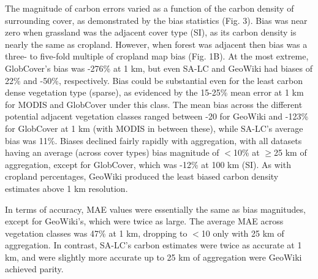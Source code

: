 \documentclass{pnastwo2}
\begin{document}
\begin{article}
The magnitude of carbon errors varied as a function of the carbon density of surrounding cover, as demonstrated by the bias statistics (Fig. 3). Bias was near zero when grassland was the adjacent cover type (SI), as its carbon density is nearly the same as cropland. However, when forest was adjacent then bias was a three- to five-fold multiple of cropland map bias (Fig. 1B). At the most extreme, GlobCover's bias was -276\% at 1 km, but even SA-LC and GeoWiki had biases of 22\% and -50\%, respectively. Bias could be substantial even for the least carbon dense vegetation type (sparse), as evidenced by the 15-25\% mean error at 1 km for MODIS and GlobCover under this class.  The mean bias across the different potential adjacent vegetation classes ranged between -20 for GeoWiki and -123\% for GlobCover at 1 km (with MODIS in between these), while SA-LC's average bias was 11\%.  Biases declined fairly rapidly with aggregation, with all datasets having an average (across cover types) bias magnitude of $<$10\% at $\geq$25 km of aggregation, except for GlobCover, which was -12\% at 100 km (SI).  As with cropland percentages, GeoWiki produced the least biased carbon density estimates above 1 km resolution. 

In terms of accuracy, MAE values were essentially the same as bias magnitudes, except for GeoWiki's, which were twice as large. The average MAE across vegetation classes was 47\% at 1 km, dropping to $<$10 only with 25 km of aggregation. In contrast, SA-LC's carbon estimates were twice as accurate at 1 km, and were slightly more accurate up to 25 km of aggregation were GeoWiki achieved parity.  


\end{article}
\end{document}

